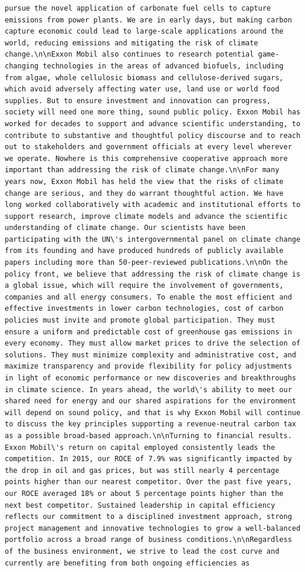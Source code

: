 \documentclass[
  letterpaper,
  DIV=11,
  numbers=noendperiod]{scrreprt}
\begin{document}
\begin{verbatim}
pursue the novel application of carbonate fuel cells to capture emissions from power plants. We are in early days, but making carbon capture economic could lead to large-scale applications around the world, reducing emissions and mitigating the risk of climate change.\n\nExxon Mobil also continues to research potential game-changing technologies in the areas of advanced biofuels, including from algae, whole cellulosic biomass and cellulose-derived sugars, which avoid adversely affecting water use, land use or world food supplies. But to ensure investment and innovation can progress, society will need one more thing, sound public policy. Exxon Mobil has worked for decades to support and advance scientific understanding, to contribute to substantive and thoughtful policy discourse and to reach out to stakeholders and government officials at every level wherever we operate. Nowhere is this comprehensive cooperative approach more important than addressing the risk of climate change.\n\nFor many years now, Exxon Mobil has held the view that the risks of climate change are serious, and they do warrant thoughtful action. We have long worked collaboratively with academic and institutional efforts to support research, improve climate models and advance the scientific understanding of climate change. Our scientists have been participating with the UN\'s intergovernmental panel on climate change from its founding and have produced hundreds of publicly available papers including more than 50-peer-reviewed publications.\n\nOn the policy front, we believe that addressing the risk of climate change is a global issue, which will require the involvement of governments, companies and all energy consumers. To enable the most efficient and effective investments in lower carbon technologies, cost of carbon policies must invite and promote global participation. They must ensure a uniform and predictable cost of greenhouse gas emissions in every economy. They must allow market prices to drive the selection of solutions. They must minimize complexity and administrative cost, and maximize transparency and provide flexibility for policy adjustments in light of economic performance or new discoveries and breakthroughs in climate science. In years ahead, the world\'s ability to meet our shared need for energy and our shared aspirations for the environment will depend on sound policy, and that is why Exxon Mobil will continue to discuss the key principles supporting a revenue-neutral carbon tax as a possible broad-based approach.\n\nTurning to financial results. Exxon Mobil\'s return on capital employed consistently leads the competition. In 2015, our ROCE of 7.9% was significantly impacted by the drop in oil and gas prices, but was still nearly 4 percentage points higher than our nearest competitor. Over the past five years, our ROCE averaged 18% or about 5 percentage points higher than the next best competitor. Sustained leadership in capital efficiency reflects our commitment to a disciplined investment approach, strong project management and innovative technologies to grow a well-balanced portfolio across a broad range of business conditions.\n\nRegardless of the business environment, we strive to lead the cost curve and currently are benefiting from both ongoing efficiencies as 
\end{verbatim}
\end{document}
